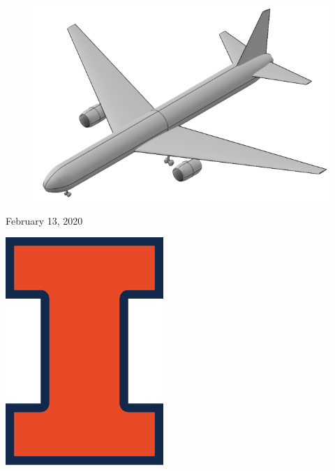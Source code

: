 \begin{titlepage}
	
        \begin{figure}[H]
            \centering
            \includegraphics[width=0.80\linewidth]{Photos/Isometric_Aircraft__2-12-20_-Transparent Background.png}
            \label{figISO}
        \end{figure}
	
	
	\vfill\vfill\vfill %
	
	{\large February 13, 2020} %
	
	
	\vfill\vfill
	\begin{minipage}{\linewidth}
		\begin{flushright}
	        \includegraphics[scale=0.5]{Photos/Illinois-Logo-Full-Color-RGB.png}\\[1cm]
		\end{flushright}
	\end{minipage}
	 
	
	\vfill %
	
\end{titlepage}




